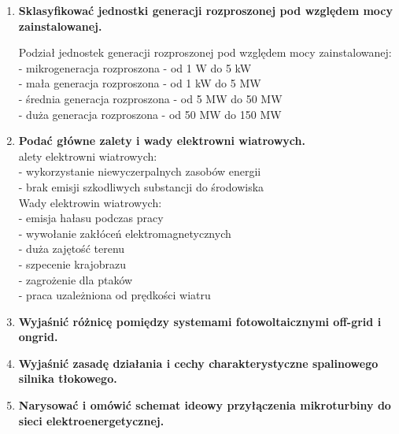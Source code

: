 \documentclass[12pt]{article}
\newcommand{\pytanie}[2]{\item \textbf{#1} \\}
\begin{document}
\begin{enumerate}
    \item \textbf{Sklasyfikować jednostki generacji rozproszonej pod względem mocy zainstalowanej.}

        Podział jednostek generacji rozproszonej pod względem mocy zainstalowanej:\\
        - mikrogeneracja rozproszona - od 1 W do 5 kW\\
        - mała generacja rozproszona - od 1 kW do 5 MW\\
        - średnia generacja rozproszona - od 5 MW do 50 MW\\
        - duża generacja rozproszona - od 50 MW do 150 MW
        
    \pytanie{Podać główne zalety i wady elektrowni wiatrowych.}

        Zalety elektrowni wiatrowych:\\
        - wykorzystanie niewyczerpalnych zasobów energii\\
        - brak emisji szkodliwych substancji do środowiska\\
        Wady elektrowin wiatrowych:\\
        - emisja hałasu podczas pracy\\
        - wywołanie zakłóceń elektromagnetycznych\\
        - duża zajętość terenu\\
        - szpecenie krajobrazu\\
        - zagrożenie dla ptaków\\
        - praca uzależniona od prędkości wiatru
        
    \item \textbf{Wyjaśnić różnicę pomiędzy systemami fotowoltaicznymi off-grid i ongrid.}
    \item \textbf{Wyjaśnić zasadę działania i cechy charakterystyczne spalinowego silnika tłokowego.}
    \item \textbf{Narysować i omówić schemat ideowy przyłączenia mikroturbiny do sieci elektroenergetycznej.}
\end{enumerate}
\end{document}
